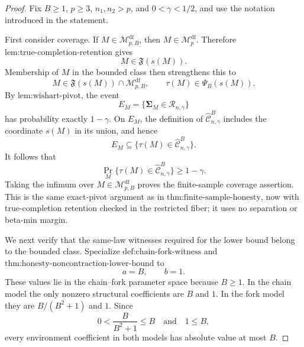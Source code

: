 \documentclass{article}
\begin{document}
\begin{proof}
Fix \(B\ge1\), \(p\ge3\), \(n_1,n_2>p\), and \(0<\gamma<1/2\), and use the notation introduced in the statement.

First consider coverage.  If \(M\in\mathcal M_{p,B}^{\mathrm{df}}\), then \(M\in\mathcal M_p^{\mathrm{df}}\).  Therefore \(\text{lem:true-completion-retention}\) gives
\[
M\in\mathfrak F(s(M)).
\]
Membership of \(M\) in the bounded class then strengthens this to
\[
M\in\mathfrak F(s(M))\cap\mathcal M_{p,B}^{\mathrm{df}},
\qquad
\tau(M)\in\Psi_B(s(M)).
\]
By \(\text{lem:wishart-pivot}\), the event
\[
E_M=\{\boldsymbol\Sigma_M\in\mathcal R_{n,\gamma}\}
\]
has probability exactly \(1-\gamma\).  On \(E_M\), the definition of \(\widehat{\mathcal C}^{B}_{n,\gamma}\) includes the coordinate \(s(M)\) in its union, and hence
\[
E_M\subseteq
\{\tau(M)\in\widehat{\mathcal C}^{B}_{n,\gamma}\}.
\]
It follows that
\[
\Pr_M\{\tau(M)\in\widehat{\mathcal C}^{B}_{n,\gamma}\}
\ge1-\gamma.
\]
Taking the infimum over \(M\in\mathcal M_{p,B}^{\mathrm{df}}\) proves the finite-sample coverage assertion.  This is the same exact-pivot argument as in \(\text{thm:finite-sample-honesty}\), now with true-completion retention checked in the restricted fiber; it uses no separation or beta-min margin.

We next verify that the same-law witnesses required for the lower bound belong to the bounded class.  Specialize \(\text{def:chain-fork-witness}\) and \(\text{thm:honesty-noncontraction-lower-bound}\) to
\[
a=B,
\qquad
b=1.
\]
These values lie in the chain--fork parameter space because \(B\ge1\).  In the chain model the only nonzero structural coefficients are \(B\) and \(1\).  In the fork model they are \(B/(B^2+1)\) and \(1\).  Since
\[
0<\frac{B}{B^2+1}\le B
\quad\text{and}\quad
1\le B,
\]
every environment coefficient in both models has absolute value at most \(B\).


\end{proof}
\end{document}
